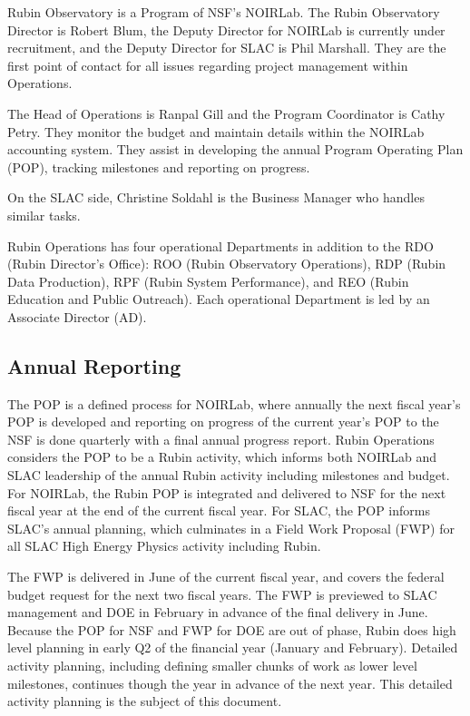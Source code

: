 Rubin Observatory is a Program of NSF's NOIRLab.
The Rubin Observatory \gls{Director} is Robert Blum, the Deputy \gls{Director} for NOIRLab is currently under recruitment, and the Deputy \gls{Director} for SLAC is Phil Marshall.
They are the first point of contact for all issues regarding project management within \RO Operations.

The Head of Operations is Ranpal Gill and the Program Coordinator is Cathy Petry.
They monitor the budget and maintain details within the NOIRLab accounting system.
They assist in developing the annual Program Operating Plan (POP), tracking milestones and reporting on progress.

On the SLAC side, Christine Soldahl is the Business Manager who handles similar tasks.

Rubin Operations has four operational Departments in addition to the RDO (Rubin Director’s Office): ROO (Rubin Observatory Operations), RDP (Rubin Data Production), RPF (Rubin System Performance), and REO (Rubin Education and Public Outreach).
Each operational Department is led by an Associate Director (AD).

\subsection{Annual Reporting}
\label{sec:reporting}

The POP is a defined process for NOIRLab, where annually the next fiscal year's POP is developed and reporting on progress of the current year's POP to the NSF is done quarterly with a final annual progress report.
Rubin Operations considers the POP to be a Rubin activity, which informs both NOIRLab and SLAC leadership of the annual Rubin activity including milestones and budget.
For NOIRLab, the Rubin POP is integrated and delivered to NSF for the next fiscal year at the end of the current fiscal year.
For SLAC, the POP informs SLAC's annual planning, which culminates in a Field Work Proposal (FWP) for all SLAC High Energy Physics activity including Rubin.

The FWP is delivered in June of the current fiscal year, and covers the federal budget request for the next two fiscal years.
The FWP is previewed to SLAC management and DOE in February in advance of the final delivery in June.
Because the POP for NSF and FWP for DOE are out of phase, Rubin does high level planning in early Q2 of the financial year (January and February).
Detailed activity planning, including defining smaller chunks of work as lower level milestones, continues though the year in advance of the next year.
This detailed activity planning is the subject of this document.

